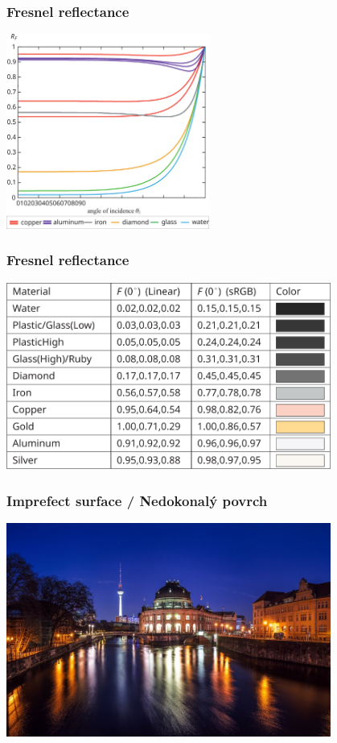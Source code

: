 \begin{frame}\frametitle{Fresnel reflectance}
    \includegraphics[width=0.5\textwidth]{pics/physicallyBasedRendering/fresnel_reflectance}
\end{frame}

\begin{frame}\frametitle{Fresnel reflectance}
    \includegraphics[width=0.8\textwidth]{pics/physicallyBasedRendering/fresnel_reflectance_table}
\end{frame}

\begin{frame}\frametitle{Imprefect surface / Nedokonalý povrch}
    \includegraphics[width=0.8\textwidth]{pics/physicallyBasedRendering/night-reflect}
\end{frame}

